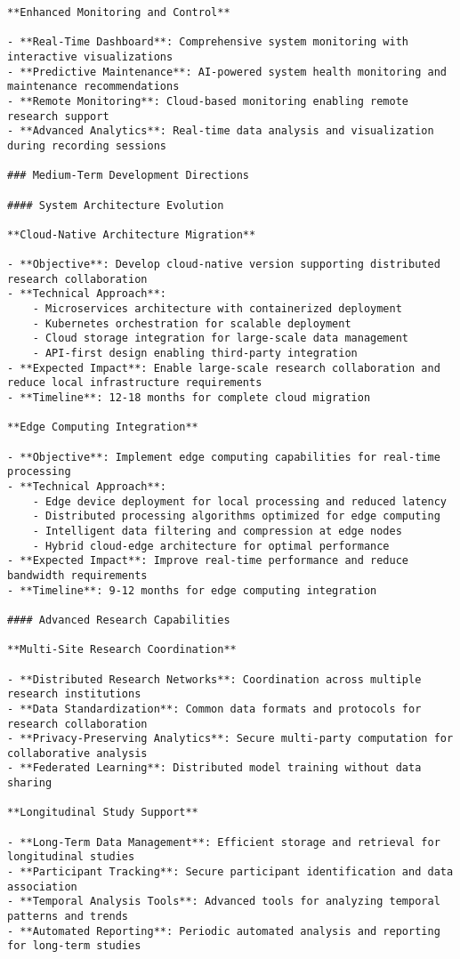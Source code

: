 \documentclass[12pt,a4paper]{report}
\begin{document}
\begin{verbatim}
**Enhanced Monitoring and Control**

- **Real-Time Dashboard**: Comprehensive system monitoring with interactive visualizations
- **Predictive Maintenance**: AI-powered system health monitoring and maintenance recommendations
- **Remote Monitoring**: Cloud-based monitoring enabling remote research support
- **Advanced Analytics**: Real-time data analysis and visualization during recording sessions

### Medium-Term Development Directions

#### System Architecture Evolution

**Cloud-Native Architecture Migration**

- **Objective**: Develop cloud-native version supporting distributed research collaboration
- **Technical Approach**:
    - Microservices architecture with containerized deployment
    - Kubernetes orchestration for scalable deployment
    - Cloud storage integration for large-scale data management
    - API-first design enabling third-party integration
- **Expected Impact**: Enable large-scale research collaboration and reduce local infrastructure requirements
- **Timeline**: 12-18 months for complete cloud migration

**Edge Computing Integration**

- **Objective**: Implement edge computing capabilities for real-time processing
- **Technical Approach**:
    - Edge device deployment for local processing and reduced latency
    - Distributed processing algorithms optimized for edge computing
    - Intelligent data filtering and compression at edge nodes
    - Hybrid cloud-edge architecture for optimal performance
- **Expected Impact**: Improve real-time performance and reduce bandwidth requirements
- **Timeline**: 9-12 months for edge computing integration

#### Advanced Research Capabilities

**Multi-Site Research Coordination**

- **Distributed Research Networks**: Coordination across multiple research institutions
- **Data Standardization**: Common data formats and protocols for research collaboration
- **Privacy-Preserving Analytics**: Secure multi-party computation for collaborative analysis
- **Federated Learning**: Distributed model training without data sharing

**Longitudinal Study Support**

- **Long-Term Data Management**: Efficient storage and retrieval for longitudinal studies
- **Participant Tracking**: Secure participant identification and data association
- **Temporal Analysis Tools**: Advanced tools for analyzing temporal patterns and trends
- **Automated Reporting**: Periodic automated analysis and reporting for long-term studies


\end{verbatim}
\end{document}
